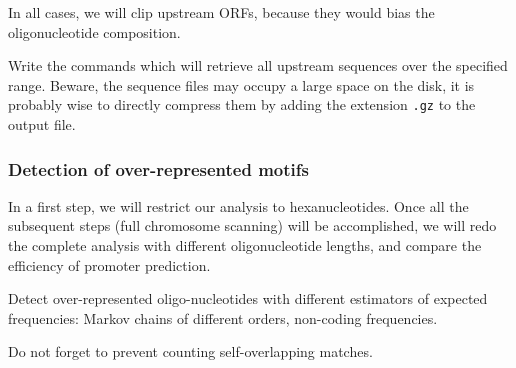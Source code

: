 In all cases, we will clip upstream ORFs, because they would bias the
oligonucleotide composition.

Write the commands which will retrieve all upstream sequences over the
specified range. Beware, the sequence files may occupy a large space
on the disk, it is probably wise to directly compress them by adding
the extension \texttt{.gz} to the output file.

\subsubsection{Detection of over-represented motifs}

In a first step, we will restrict our analysis to
hexanucleotides. Once all the subsequent steps (full chromosome
scanning) will be accomplished, we will redo the complete analysis
with different oligonucleotide lengths, and compare the efficiency of
promoter prediction.

Detect over-represented oligo-nucleotides with different estimators of
expected frequencies: Markov chains of different orders, non-coding
frequencies. 

Do not forget to prevent counting self-overlapping matches.

